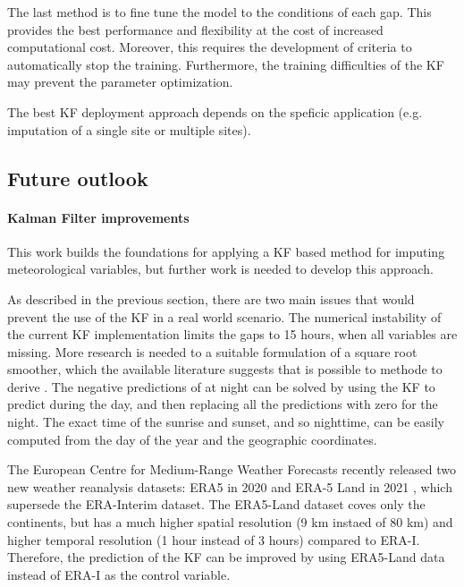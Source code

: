 \documentclass{article}
\let\Oldsubsection\subsection
\renewcommand{\subsection}{\FloatBarrier\Oldsubsection}
\begin{document}
The last method is to fine tune the model to the conditions of each gap. This provides the best performance and flexibility at the cost of increased computational cost. Moreover, this requires the development of criteria to automatically stop the training. Furthermore, the training difficulties of the KF may prevent the parameter optimization.

The best KF deployment approach depends on the speficic application (e.g. imputation of a single site or multiple sites).

\subsection{Future outlook}

\paragraph{Kalman Filter improvements} This work builds the foundations for applying a KF based method for imputing meteorological variables, but further work is needed to develop this approach.

As described in the previous section, there are two main issues that would prevent the use of the KF in a real world scenario.
The numerical instability of the current KF implementation limits the gaps to 15 hours, when all variables are missing.
More research is needed to a suitable formulation of a square root smoother, which the available literature suggests that is possible to methode to derive \cite{rutten_square-root_2013, park_new_1996}. 
The negative predictions of  at night can be solved by using the KF to predict  during the day, and then replacing all the predictions with zero for the night. The exact time of the sunrise and sunset, and so nighttime, can be easily computed from the day of the year and the geographic coordinates.

The European Centre for Medium-Range Weather Forecasts recently released two new weather reanalysis datasets: ERA5 in 2020 \cite{hersbach_era5_2020} and ERA-5 Land  in 2021 \cite{munoz-sabater_era5-land_2021}, which supersede the ERA-Interim dataset. The ERA5-Land dataset coves only the continents, but has a much higher spatial resolution (9 km instaed of 80 km) and higher temporal resolution (1 hour instead of 3 hours) compared to ERA-I. Therefore, the prediction of the KF can be improved by using ERA5-Land data instead of ERA-I as the control variable.
\end{document}
